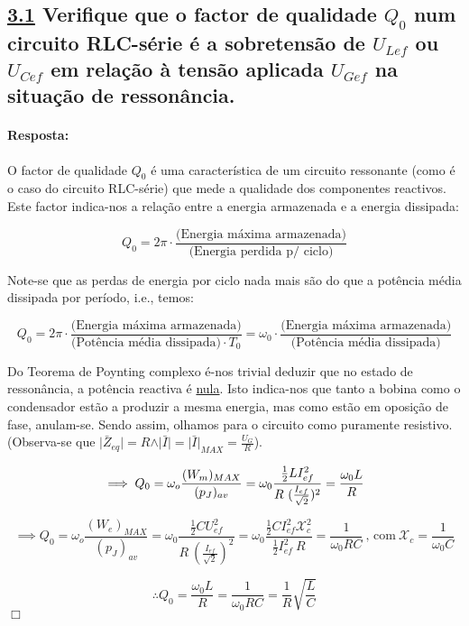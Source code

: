\subsection*{\underline{3.1} Verifique que o factor de qualidade $Q_0$ num circuito RLC-série é a sobretensão de $U_{Lef}$ ou $U_{Cef}$ em relação à tensão aplicada $U_{Gef}$ na situação de ressonância.}
\label{subsection3_1}
\paragraph{Resposta:}
O factor de qualidade $Q_0$  é uma característica de um circuito ressonante (como é o caso do circuito RLC-série) que mede a qualidade dos componentes reactivos. Este factor indica-nos a relação entre a energia armazenada e a energia dissipada:

$$ Q_0 = 2\pi \cdot \frac{\text{(Energia máxima armazenada)}}{\text{(Energia perdida p/ ciclo)}} $$

Note-se que as perdas de energia por ciclo nada mais são do que a potência média dissipada por período, i.e., temos:

$$ Q_0 = 2\pi \cdot \frac{\text{(Energia máxima armazenada)}}{\text{(Potência média dissipada)}\cdot T_0} = \omega_0 \cdot \frac{\text{(Energia máxima armazenada)}}{\text{(Potência média dissipada)}}$$

Do Teorema de Poynting complexo é-nos trivial deduzir que no estado de ressonância, a potência reactiva é \underline{nula}. Isto indica-nos que tanto a bobina como o condensador estão a produzir a mesma energia, mas como estão em oposição de fase, anulam-se. Sendo assim, olhamos para o circuito como puramente resistivo. (Observa-se que $\vert \bar{Z}_{eq}\vert = R \land \vert \bar{I}\vert = \vert\bar{I}\vert_{MAX} = \frac{U_{G}}{R}$).

$$ 
\implies Q_0 = \omega_o \frac{(W_m)_{MAX}}{(p_J)_{av}} = \omega_0 \frac{\frac{1}{2}LI_{ef}^2}{R\ (\frac{I_{ef}}{\sqrt{2}})^2} = \frac{\omega_0 L}{R}\\ 
$$

$$
\implies Q_0 = \omega_o \frac{(W_e)_{MAX}}{(p_J)_{av}} = \omega_0 \frac{\frac{1}{2}C U_{ef}^2}{R\ (\frac{I_{ef}}{\sqrt{2}})^2} = \omega_0 \frac{\frac{1}{2} C I_{ef}^2 \mathcal{X}_c^2}{\frac{1}{2}I_{ef}^2\ R} = \frac{1}{\omega_0 RC}\ \text{, com}\ \mathcal{X}_c = \frac{1}{\omega_0 C}
$$

$$
\therefore Q_0 = \frac{\omega_0 L}{R} = \frac{1}{\omega_0 RC} = \frac{1}{R}\sqrt{\frac{L}{C}}
$$
\hfill \ensuremath{\Box}

